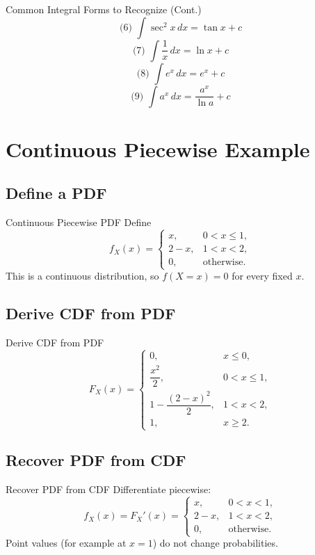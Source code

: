\documentclass[aspectratio=169]{beamer}
\begin{document}
\begin{frame}{Common Integral Forms to Recognize (Cont.)}
  \[
  \text{(6) }\int \sec^2 x\,dx = \tan x + c
  \]
  \[
  \text{(7) }\int \frac{1}{x}\,dx = \ln x + c
  \]
  \[
  \text{(8) }\int e^x\,dx = e^x + c
  \]
  \[
  \text{(9) }\int a^x\,dx = \frac{a^x}{\ln a} + c
  \]
\end{frame}


\section{Continuous Piecewise Example}

\subsection{Define a PDF}
\begin{frame}{Continuous Piecewise PDF}
  Define
  \[
    f_X(x)=
    \begin{cases}
      x, & 0<x\le 1,\\
      2-x, & 1<x<2,\\
      0, & \text{otherwise}.
    \end{cases}
  \]
  This is a continuous distribution, so \(f(X=x)=0\) for every fixed \(x\).
\end{frame}

\subsection{Derive CDF from PDF}
\begin{frame}{Derive CDF from PDF}
  \[
    F_X(x)=
    \begin{cases}
      0, & x\le 0,\\
      \dfrac{x^2}{2}, & 0<x\le 1,\\
      1-\dfrac{(2-x)^2}{2}, & 1<x<2,\\
      1, & x\ge 2.
    \end{cases}
  \]
\end{frame}

\subsection{Recover PDF from CDF}
\begin{frame}{Recover PDF from CDF}
  Differentiate piecewise:
  \[
    f_X(x)=F_X'(x)=
    \begin{cases}
      x, & 0<x<1,\\
      2-x, & 1<x<2,\\
      0, & \text{otherwise}.
    \end{cases}
  \]
  Point values (for example at \(x=1\)) do not change probabilities.
\end{frame}
\end{document}
